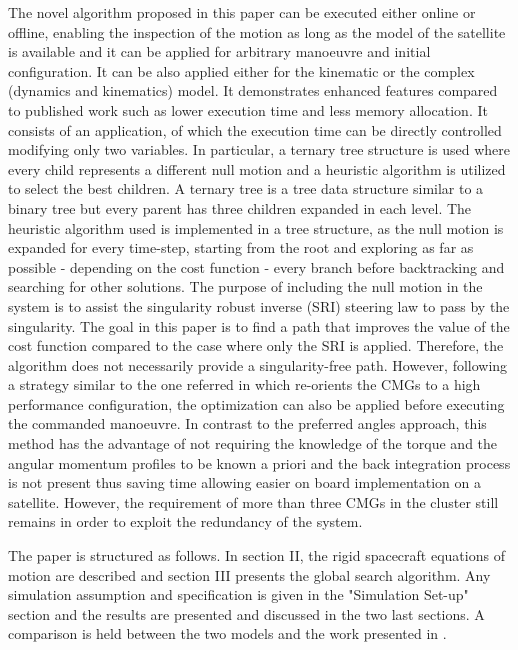 \documentclass[journal]{new-aiaa}
\begin{document}
The novel algorithm proposed in this paper can be executed either online or offline, enabling the inspection of the motion as long as the model of the satellite is available and it can be applied for arbitrary manoeuvre and initial configuration. It can be also applied either for the kinematic or the complex (dynamics and kinematics) model. It demonstrates enhanced features compared to published work such as lower execution time and less memory allocation. It consists of an application, of which the execution time can be directly controlled modifying only two variables. In particular, a ternary tree structure is used where every child represents a different null motion and a heuristic algorithm is utilized to select the best children. A ternary tree is a tree data structure similar to a binary tree but every parent has three children expanded in each level. The heuristic algorithm used is implemented in a tree structure, as the null motion is expanded for every time-step, starting from the root and exploring as far as possible - depending on the cost function - every branch before backtracking and searching for other solutions. The purpose of including the null motion in the system is to assist the singularity robust inverse (SRI) steering law to pass by the singularity. 
The goal in this paper is to find a path that improves the value of the cost function compared to the case where only the SRI is applied. Therefore, the algorithm does not necessarily provide a singularity-free path. However, following a strategy similar to the one referred in \cite{vadali_preferred} which re-orients the CMGs to a high performance configuration, the optimization can also be applied before executing the commanded manoeuvre.
In contrast to the preferred angles approach, this method has the advantage of not requiring the knowledge of the torque and the angular momentum profiles to be known a priori and the back integration process is not present thus saving time allowing easier on board implementation on a satellite. However, the requirement of more than three CMGs in the cluster still remains in order to exploit the redundancy of the system.

The paper is structured as follows. In section II, the rigid spacecraft equations of motion are described and section III presents the global search algorithm. Any simulation assumption and specification is given in the "Simulation Set-up" section and the results are presented and discussed in the two last sections. A comparison is held between the two models and the work presented in \cite{paradiso}.
\end{document}
